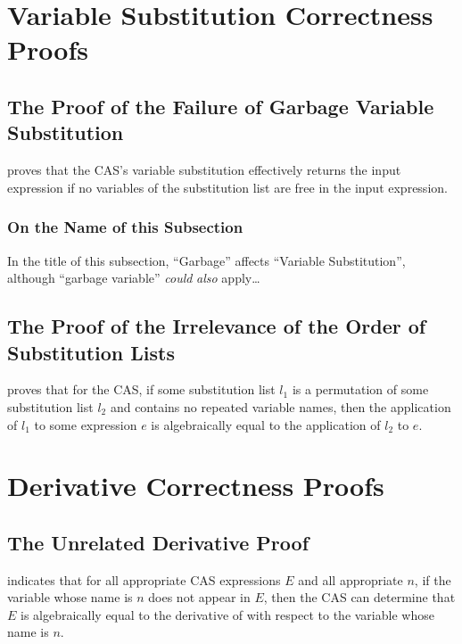 \documentclass{report}
\begin{document}
\section{Variable Substitution Correctness Proofs}

\subsection{The Proof of the Failure of Garbage Variable Substitution}
  proves that the  CAS's variable substitution effectively returns the input expression if no variables of the substitution list are free in the input expression.

\subsubsection{On the Name of this Subsection}\label{sec:garbageVariableSubstitutionPseudoFootnote} %
In the title of this subsection, ``Garbage'' affects ``Variable Substitution'', although ``garbage variable'' \emph{could} \emph{also} apply\ldots

\subsection{The Proof of the Irrelevance of the Order of Substitution Lists}
  proves that for the  CAS, if some substitution list \(l_1\) is a permutation of some substitution list \(l_2\) and contains no repeated variable names, then the application of \(l_1\) to some expression \(e\) is algebraically equal to the application of \(l_2\) to \(e\).

\section{Derivative Correctness Proofs}

\subsection{The Unrelated Derivative Proof}
  indicates that for all appropriate  CAS expressions \(E\) and all appropriate \(n\), if the variable whose name is \(n\) does not appear in \(E\), then the  CAS can determine that \(E\) is algebraically equal to the derivative of  with respect to the variable whose name is \(n\).
\end{document}
